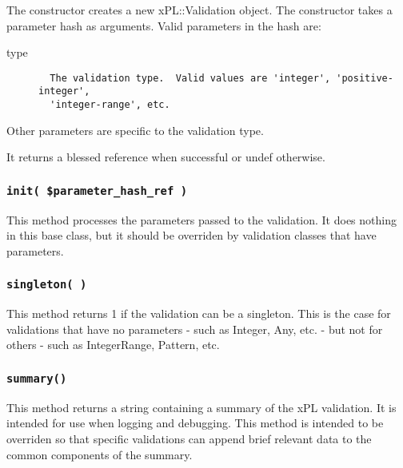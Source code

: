 The constructor creates a new xPL::Validation object.  The constructor
takes a parameter hash as arguments.  Valid parameters in the hash
are:

\begin{description}

\item[{type}] \mbox{}\begin{verbatim}
  The validation type.  Valid values are 'integer', 'positive-integer',
  'integer-range', etc.
\end{verbatim}
\end{description}


Other parameters are specific to the validation type.



It returns a blessed reference when successful or undef otherwise.

\subsubsection*{\texttt{init( \$parameter\_hash\_ref )}\label{xPL::Validation_init_parameter_hash_ref_}}


This method processes the parameters passed to the validation.  It
does nothing in this base class, but it should be overriden by
validation classes that have parameters.

\subsubsection*{\texttt{singleton( )}\label{xPL::Validation_singleton_}}


This method returns 1 if the validation can be a singleton.  This
is the case for validations that have no parameters - such as
Integer, Any, etc. - but not for others - such as IntegerRange,
Pattern, etc.

\subsubsection*{\texttt{summary()}\label{xPL::Validation_summary_}}


This method returns a string containing a summary of the xPL
validation.  It is intended for use when logging and debugging.  This
method is intended to be overriden so that specific validations can
append brief relevant data to the common components of the summary.


